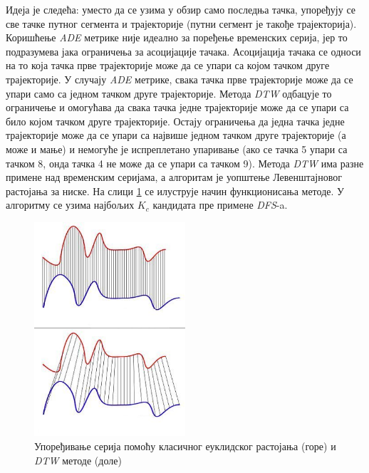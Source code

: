 \documentclass[11pt,oneside]{memoir}
\begin{document}
Идеја је следећа: уместо да се узима у обзир само последња тачка, упоређују се све тачке путног сегмента и трајекторије 
(путни сегмент је такође трајекторија). Коришћење \textit{ADE} метрике није идеално за поређење временских серија, јер 
то подразумева јака ограничења за асоцијације тачака. Асоцијација тачака се односи на то која тачка прве трајекторије може 
да се упари са којом тачком друге трајекторије. У случају \textit{ADE} метрике, свака тачка прве трајекторије
може да се упари само са једном тачком друге трајекторије. Метода \textit{DTW} одбацује то ограничење и омогућава
да свака тачка једне трајекторије може да се упари са било којом тачком друге трајекторије. Остају ограничења да једна
тачка једне трајекторије може да се упари са највише једном тачком друге трајекторије (а може и мање) и 
немогуће је испреплетано упаривање (ако се тачка 5 упари са тачком 8, онда тачка 4 не може да се упари са тачком 9). Метода
\textit{DTW} има разне примене над временским серијама, а алгоритам је уопштење Левенштајновог растојања за ниске. На слици
\ref{euclidean_vs_dtw} се илуструје начин функционисања методе. У алгоритму се узима најбољих $K_c$ кандидата пре примене 
\textit{DFS}-a.

\begin{figure}[H]
  \centering
  \includegraphics[width=0.5\textwidth]{images/Euclidean_vs_DTW.jpg}
  \caption{Упоређивање серија помоћу класичног еуклидског растојања (горе) и \textit{DTW} методе (доле)}
  \label{euclidean_vs_dtw}
\end{figure}
\end{document}
